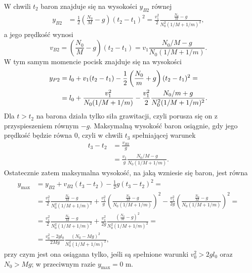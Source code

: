 \documentclass[12pt,a4paper]{article}
\begin{document}
W chwili $t_2$ baron znajduje się na wysokości $y_{B2}$ równej
\begin{align}
    y_{B2} &= \frac{1}{2} \left( \frac{N_0}{M} - g \right) (t_2 - t_1)^2 = \frac{v_1^2}{2} \frac{\frac{N_0}{M}-g}{N_0^2(1/M+1/m)^2},
\end{align}
a jego prędkość wynosi
\begin{equation}
    v_{B2} = \left( \frac{N_0}{M} - g \right) (t_2 - t_1) = v_1 \frac{N_0/M - g}{N_0(1/M+1/m)}.
\end{equation}
W tym samym momencie pocisk znajduje się na wysokości
\begin{align}
    y_{P2} &= l_0 + v_1(t_2-t_1) - \frac{1}{2} \left( \frac{N_0}{m} + g \right) (t_2 - t_1)^2 = \notag \\
    &= l_0 + \frac{v_1^2}{N_0(1/M+1/m)} - \frac{v_1^2}{2} \frac{N_0/m+g}{N_0^2(1/M+1/m)^2}.
\end{align}
Dla $t > t_2$ na barona działa tylko siła grawitacji, czyli porusza się on z przyspieszeniem równym $-g$. Maksymalną wysokość baron osiągnie, gdy jego prędkość będzie równa 0, czyli w chwili $t_3$ spełniającej warunek
\begin{align}
    t_3 - t_2 &= \frac{v_{B2}}{g} \\
    &= \frac{v_1}{g} \frac{N_0/M - g}{N_0(1/M+1/m)}.
\end{align}
Ostatecznie zatem maksymalna wysokość, na jaką wzniesie się baron, jest równa
\begin{align}
    y_{\text{max}} &= y_{B2} + v_{B2} (t_3 - t_2) - \frac{1}{2} g (t_3 - t_2)^2 = \\
    &= \frac{v_1^2}{2} \frac{\frac{N_0}{M}-g}{N_0^2(1/M+1/m)^2} + \frac{v_1^2}{g} \left( \frac{\frac{N_0}{M}-g}{N_0(1/M+1/m)} \right)^2 - \frac{v_1^2}{2g} \left( \frac{\frac{N_0}{M}-g}{N_0(1/M+1/m)} \right)^2 = \\
    &= \frac{v_1^2}{2} \frac{\frac{N_0}{M}-g}{N_0^2(1/M+1/m)^2} + \frac{v_1^2}{2g} \frac{(\frac{N_0}{M}-g)^2}{N_0^2(1/M+1/m)^2} = \\
    &= \frac{v_0^2 - 2gl_0}{2Mg} \frac{(N_0 - Mg)^2}{N_0^2(1/M+1/m)^2},
\end{align}
przy czym jest ona osiągana tylko, jeśli są spełnione warunki $v_0^2 > 2gl_0$ oraz $N_0 > Mg$; w przeciwnym razie $y_{\text{max}} = 0 \text{ m}$.
\end{document}
